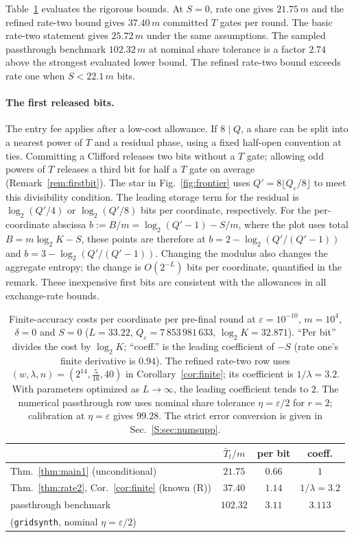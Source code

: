 \documentclass[aps,prx,twocolumn,superscriptaddress,nofootinbib,longbibliography]{revtex4-2}
\theoremstyle{plain}
\theoremstyle{definition}
\theoremstyle{remark}
\begin{document}
Table~\ref{tab:numbers} evaluates the rigorous bounds. At $S=0$, rate one gives $21.75\,m$ and the refined rate-two bound gives $37.40\,m$ committed $T$ gates per round. The basic rate-two statement gives $25.72\,m$ under the same assumptions. The sampled passthrough benchmark $102.32\,m$ at nominal share tolerance is a factor $2.74$ above the strongest evaluated lower bound. The refined rate-two bound exceeds rate one when $S<22.1\,m$ bits.

\paragraph{The first released bits.} The entry fee applies after a low-cost allowance. If $8\mid Q$, a share can be split into a nearest power of $T$ and a residual phase, using a fixed half-open convention at ties. Committing a Clifford releases two bits without a $T$ gate; allowing odd powers of $T$ releases a third bit for half a $T$ gate on average (Remark~\ref{rem:firstbit}). The star in Fig.~\ref{fig:frontier} uses $Q'=8\lfloor Q_\varepsilon/8\rfloor$ to meet this divisibility condition. The leading storage term for the residual is $\log_2(Q'/4)$ or $\log_2(Q'/8)$ bits per coordinate, respectively. For the per-coordinate abscissa $b:=B/m=\log_2(Q'-1)-S/m$, where the plot uses total $B=m\log_2K-S$, these points are therefore at $b=2-\log_2(Q'/(Q'-1))$ and $b=3-\log_2(Q'/(Q'-1))$. Changing the modulus also changes the aggregate entropy; the change is $O(2^{-L})$ bits per coordinate, quantified in the remark. These inexpensive first bits are consistent with the allowances in all exchange-rate bounds.


\begin{table}[t]
\centering\footnotesize
\caption{Finite-accuracy costs per coordinate per pre-final round at $\varepsilon=10^{-10}$, $m=10^4$, $\delta=0$ and $S=0$ ($L=33.22$, $Q_\varepsilon=7\,853\,981\,633$, $\log_2K=32.871$). ``Per bit'' divides the cost by $\log_2K$; ``coeff.'' is the leading coefficient of $-S$ (rate one's finite derivative is $0.94$). The refined rate-two row uses $(w,\lambda,n)=(2^{14},\tfrac5{16},40)$ in Corollary~\ref{cor:finite}; its coefficient is $1/\lambda=3.2$. With parameters optimized as $L\to\infty$, the leading coefficient tends to $2$. The numerical passthrough row uses nominal share tolerance $\eta=\varepsilon/2$ for $r=2$; calibration at $\eta=\varepsilon$ gives $99.28$. The strict error conversion is given in Sec.~\ref{S:sec:numsupp}.}
\label{tab:numbers}
\setlength{\tabcolsep}{4pt}\begin{tabular}{@{}l ccc@{}}
\toprule
& $\bar T_t/m$ & per bit & coeff.\\
\midrule
Thm.~\ref{thm:main1} (unconditional) & $21.75$ & $0.66$ & $1$\\
Thm.~\ref{thm:rate2}, Cor.~\ref{cor:finite} (known (R)) & $37.40$ & $1.14$ & $1/\lambda=3.2$\\
passthrough benchmark & $102.32$ & $3.11$ & $3.113$\\
\quad(\texttt{gridsynth}, nominal $\eta=\varepsilon/2$) & & &\\
\bottomrule
\end{tabular}
\end{table}
\end{document}
